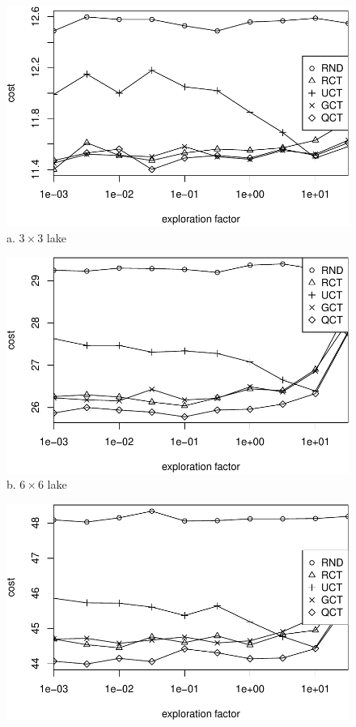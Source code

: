 \documentclass{article}
\begin{document}
\begin{figure}[t]
  \begin{minipage}[b]{0.333\linewidth}
    \centering
    \includegraphics[scale=0.35]{costs-size=3-nsamples=397.pdf}\\
    a. $3\times 3$ lake
  \end{minipage}
  \begin{minipage}[b]{0.333\linewidth}
    \centering
    \includegraphics[scale=0.35]{costs-size=6-nsamples=397.pdf}\\
    b. $6\times 6$ lake
  \end{minipage}
  \begin{minipage}[b]{0.333\linewidth}
    \centering
    \includegraphics[scale=0.35]{costs-size=10-nsamples=397.pdf}\\

\end{minipage}
\end{figure}
\end{document}
